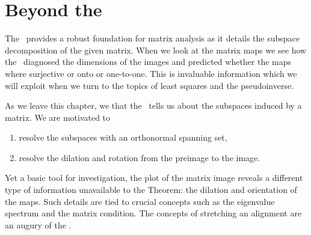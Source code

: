 \section{Beyond the \ft}
\label{sec:beyond ft}
The \ftola \ provides a robust foundation for matrix analysis as it details the subspace decomposition of the given matrix. When we look at the matrix maps we see how the \ft \ diagnosed the dimensions of the images and predicted whether the maps where surjective or onto or one-to-one. This is invaluable information which we will exploit when we turn to the topics of least squares and the pseudoinverse.

As we leave this chapter, we that the \ft \ tells us about the subspaces induced by a matrix. We are motivated to 
\begin{enumerate}
\item resolve the subspaces with an orthonormal spanning set,
\item resolve the dilation and rotation from the preimage to the image.
\end{enumerate}


Yet a basic tool for investigation, the plot of the matrix image reveals a different type of information unavailable to the Theorem: the dilation and orientation of the maps. Such details are tied to crucial concepts such as the eigenvalue spectrum and the matrix condition. The concepts of stretching an alignment are an augury of the \asvd.


\endinput